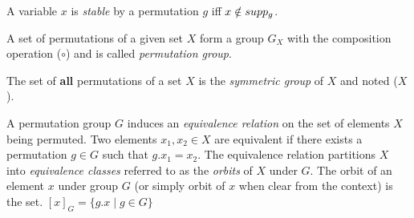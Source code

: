 \begin{definition}
 A variable $x$ is \emph{stable} by a permutation $g$  iff $x \notin supp_g$.
\end{definition}
 
\begin{definition}
 A set of permutations of a given set $X$ form a group $G_X$ with the composition operation ($\circ$) and is called \emph{permutation group}.
\end{definition}
\begin{definition}
The set of \textbf{all} permutations of a set $X$ is the \emph{symmetric group} of $X$ and noted \Group($X$).
\end{definition}
%
A permutation group $G$ induces an \emph{equivalence relation} on the set of elements $X$ being
permuted. Two elements $x_1, x_2 \in X$ are equivalent if there exists a permutation $g \in G$ such that
$g.x_1 = x_2$. The equivalence relation partitions $X$ into \emph{equivalence classes} referred to
as the \emph{orbits} of $X$ under $G$. The orbit of an element $x$ under group $G$ (or simply orbit of $x$ when clear
from the context) is the set. $[x]_G = \{g.x \mid g \in G\}$
